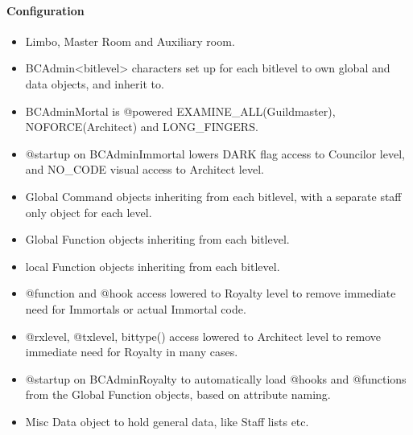 \documentclass[letterpaper,10pt,english]{sphinxmanual}
\begin{document}
\paragraph{Configuration}
\label{\detokenize{gettingstarted:configuration}}\begin{itemize}
\item {} 
\sphinxAtStartPar
Limbo, Master Room and Auxiliary room.

\item {} 
\sphinxAtStartPar
BC\sphinxhyphen{}Admin\sphinxhyphen{}\textless{}bitlevel\textgreater{} characters set up for each bitlevel to own global and
data objects, and inherit to.

\item {} 
\sphinxAtStartPar
BC\sphinxhyphen{}Admin\sphinxhyphen{}Mortal is @powered EXAMINE\_ALL(Guildmaster), NOFORCE(Architect) and
LONG\_FINGERS.

\item {} 
\sphinxAtStartPar
@startup on BC\sphinxhyphen{}Admin\sphinxhyphen{}Immortal lowers DARK flag access to Councilor level, and
NO\_CODE visual access to Architect level.

\item {} 
\sphinxAtStartPar
Global Command objects inheriting from each bitlevel, with a separate staff\sphinxhyphen{}
\sphinxhyphen{}only object for each level.

\item {} 
\sphinxAtStartPar
Global Function objects inheriting from each bitlevel.

\item {} 
\sphinxAtStartPar
local Function objects inheriting from each bitlevel.

\item {} 
\sphinxAtStartPar
@function and @hook access lowered to Royalty level to remove immediate need
for Immortals or actual Immortal code.

\item {} 
\sphinxAtStartPar
@rxlevel, @txlevel, bittype() access lowered to Architect level to remove
immediate need for Royalty in many cases.

\item {} 
\sphinxAtStartPar
@startup on BC\sphinxhyphen{}Admin\sphinxhyphen{}Royalty to automatically load @hooks and @functions from
the Global Function objects, based on attribute naming.

\item {} 
\sphinxAtStartPar
Misc Data object to hold general data, like Staff lists etc.


\end{itemize}
\end{document}
